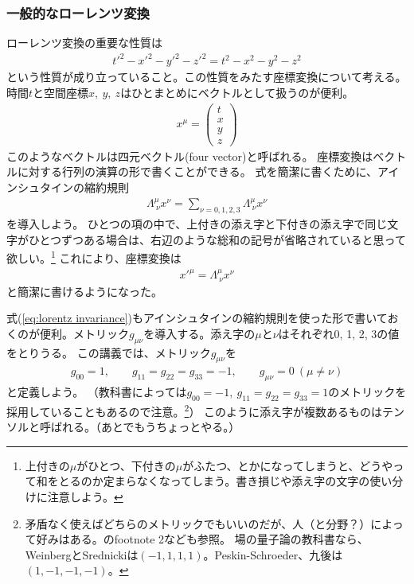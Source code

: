 \documentclass[10pt,a4paper]{jarticle}
\begin{document}
\subsubsection{一般的なローレンツ変換}
ローレンツ変換の重要な性質は
\begin{align}
t'^2 - x'^2 - y'^2 - z'^2 = t^2 - x^2 - y^2 - z^2 \label{eq:lorentz invariance}
\end{align}
という性質が成り立っていること。この性質をみたす座標変換について考える。
時間$t$と空間座標$x,~y,~z$はひとまとめにベクトルとして扱うのが便利。
\begin{align}
x^\mu = \left(\begin{array}{c}
t\\
x\\
y\\
z
\end{array}\right)
\end{align}
このようなベクトルは四元ベクトル(four vector)と呼ばれる。
%
座標変換はベクトルに対する行列の演算の形で書くことができる。
式を簡潔に書くために、アインシュタインの縮約規則
\begin{align}
\Lambda^\mu_{~\nu}x^\nu
=
\sum_{\nu=0,1,2,3} \Lambda^\mu_{~\nu}x^\nu
\end{align}
を導入しよう。
ひとつの項の中で、上付きの添え字と下付きの添え字で同じ文字がひとつずつある場合は、右辺のような総和の記号が省略されていると思って欲しい。\footnote{上付きの$\mu$がひとつ、下付きの$\mu$がふたつ、とかになってしまうと、どうやって和をとるのか定まらなくなってしまう。書き損じや添え字の文字の使い分けに注意しよう。}
これにより、座標変換は
\begin{align}
x'^{\mu} = \Lambda^\mu_{~\nu}x^\nu \label{eq:coordinate transf}
\end{align}
と簡潔に書けるようになった。

式(\ref{eq:lorentz invariance})もアインシュタインの縮約規則を使った形で書いておくのが便利。メトリック$g_{\mu\nu}$を導入する。添え字の$\mu$と$\nu$はそれぞれ0, 1, 2, 3の値をとりうる。
この講義では、メトリック$g_{\mu\nu}$を
\begin{align}
g_{00} = 1, \qquad
g_{11} = 
g_{22} = 
g_{33} = -1, \qquad
g_{\mu\nu} = 0~(\mu\neq\nu)
\end{align}
と定義しよう。
（教科書によっては$g_{00} = -1,~g_{11} = g_{22} = g_{33} = 1$のメトリックを採用していることもあるので注意。\footnote{
矛盾なく使えばどちらのメトリックでもいいのだが、人（と分野？）によって好みはある。\cite{Dreiner:2008tw}のfootnote 2なども参照。
場の量子論の教科書なら、WeinbergとSrednickiは$(-1,1,1,1)$。Peskin-Schroeder、九後は$(1,-1,-1,-1)$。}）
このように添え字が複数あるものはテンソルと呼ばれる。（あとでもうちょっとやる。）
\end{document}

